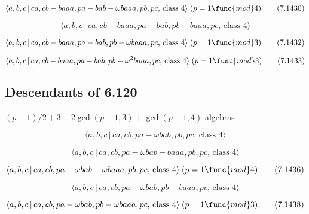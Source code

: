 \documentclass[10pt]{article}
\begin{document}
\begin{equation}
\langle a,b,c\,|\,ca,cb-baaa,pa-bab-\omega baaa,pb,pc,\,\text{class }%
4\rangle \;(p=1\func{mod}4)  \tag{7.1430}
\end{equation}

\begin{equation}
\langle a,b,c\,|\,ca,cb-baaa,pa-bab,pb-baaa,pc,\,\text{class }4\rangle 
\tag{7.1431}
\end{equation}

\begin{equation}
\langle a,b,c\,|\,ca,cb-baaa,pa-bab,pb-\omega baaa,pc,\,\text{class }%
4\rangle \;(p=1\func{mod}3)  \tag{7.1432}
\end{equation}

\begin{equation}
\langle a,b,c\,|\,ca,cb-baaa,pa-bab,pb-\omega ^{2}baaa,pc,\,\text{class }%
4\rangle \;(p=1\func{mod}3)  \tag{7.1433}
\end{equation}

\subsection{Descendants of 6.120}

$(p-1)/2+3+2\gcd (p-1,3)+\gcd (p-1,4)$ algebras

\begin{equation}
\langle a,b,c\,|\,ca,cb,pa-\omega bab,pb,pc,\,\text{class }4\rangle 
\tag{7.1434}
\end{equation}

\begin{equation}
\langle a,b,c\,|\,ca,cb,pa-\omega bab-baaa,pb,pc,\,\text{class }4\rangle 
\tag{7.1435}
\end{equation}

\begin{equation}
\langle a,b,c\,|\,ca,cb,pa-\omega bab-\omega baaa,pb,pc,\,\text{class }%
4\rangle \;(p=1\func{mod}4)  \tag{7.1436}
\end{equation}

\begin{equation}
\langle a,b,c\,|\,ca,cb,pa-\omega bab,pb-baaa,pc,\,\text{class }4\rangle 
\tag{7.1437}
\end{equation}

\begin{equation}
\langle a,b,c\,|\,ca,cb,pa-\omega bab,pb-\omega baaa,pc,\,\text{class }%
4\rangle \;(p=1\func{mod}3)  \tag{7.1438}
\end{equation}
\end{document}
